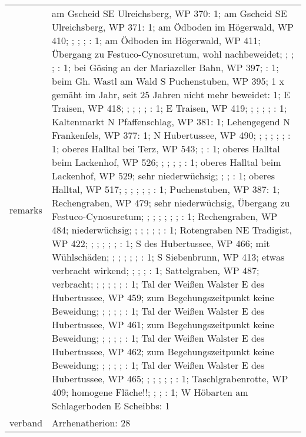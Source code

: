 \documentclass[9pt]{article}
\begin{document}
\begin{longtable}{lllllllllllllll}
remarks& \multicolumn{14}{p{150mm}}{am Gscheid SE Ulreichsberg, WP 370: 1; am Gscheid SE Ulreichsberg, WP 371: 1; am Ödboden im Högerwald, WP 410; ; ; ; : 1; am Ödboden im Högerwald, WP 411; Übergang zu Festuco-Cynosuretum, wohl nachbeweidet; ; ; ; : 1; bei Gösing an der Mariazeller Bahn, WP 397; : 1; beim Gh. Wastl am Wald S Puchenstuben, WP 395; 1 x gemäht im Jahr, seit 25 Jahren nicht mehr beweidet: 1; E Traisen, WP 418; ; ; ; ; : 1; E Traisen, WP 419; ; ; ; ; : 1; Kaltenmarkt N Pfaffenschlag, WP 381: 1; Lehengegend N Frankenfels, WP 377: 1; N Hubertussee, WP 490; ; ; ; ; ; : 1; oberes Halltal bei Terz, WP 543; ; : 1; oberes Halltal beim Lackenhof, WP 526; ; ; ; ; : 1; oberes Halltal beim Lackenhof, WP 529; sehr niederwüchsig; ; ; : 1; oberes Halltal, WP 517; ; ; ; ; ; : 1; Puchenstuben, WP 387: 1; Rechengraben, WP 479; sehr niederwüchsig, Übergang zu Festuco-Cynosuretum; ; ; ; ; ; ; : 1; Rechengraben, WP 484; niederwüchsig; ; ; ; ; ; : 1; Rotengraben NE Tradigist, WP 422; ; ; ; ; ; : 1; S des Hubertussee, WP 466; mit Wühlschäden; ; ; ; ; ; : 1; S Siebenbrunn, WP 413; etwas verbracht wirkend; ; ; ; : 1; Sattelgraben, WP 487; verbracht; ; ; ; ; ; : 1; Tal der Weißen Walster E des Hubertussee, WP 459; zum Begehungszeitpunkt keine Beweidung; ; ; ; ; : 1; Tal der Weißen Walster E des Hubertussee, WP 461; zum Begehungszeitpunkt keine Beweidung; ; ; ; ; : 1; Tal der Weißen Walster E des Hubertussee, WP 462; zum Begehungszeitpunkt keine Beweidung; ; ; ; ; : 1; Tal der Weißen Walster E des Hubertussee, WP 465; ; ; ; ; ; : 1; Taschlgrabenrotte, WP 409; homogene Fläche!!; ; ; : 1; W Höbarten am Schlagerboden E Scheibbs: 1}\tabularnewline
verband& \multicolumn{14}{p{150mm}}{Arrhenatherion: 28}\tabularnewline
\bottomrule
\end{longtable}
\end{document}
